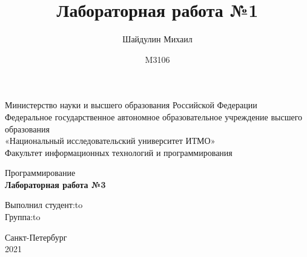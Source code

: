\documentclass[a4paper,14pt]{article}
\author{Шайдулин Михаил}
\date{M3106}
\title{\textbf{Лабораторная работа №1}}
\begin{document}
\begin{titlepage}
\newpage

\begin{center}
Министерство науки и высшего образования Российской Федерации\\
Федеральное государственное автономное образовательное учреждение высшего образования\\
«Национальный исследовательский университет ИТМО»\\
Факультет информационных технологий и программирования\\
\end{center}

\vspace{\fill}

\begin{center}
Программирование\\
\textbf{Лабораторная работа №3}\\
\end{center}

\vspace{\fill}

\newbox{\lbox}
\newlength{\maxl}
\setlength{\maxl}{\wd\lbox}
\hfill\parbox{14cm}{
\hspace*{5cm}Выполнил студент:\hfill\hbox to\\
\hspace*{5cm}Группа:\hfill\hbox to\\
}


\vspace{8em}

\begin{center}
Санкт-Петербург \\2021
\end{center}

\end{titlepage}
\end{document}
